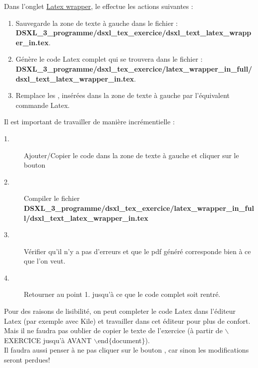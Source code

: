 \begin{dsxl}
 Dans l'onglet \underline{Latex wrapper}, le  effectue les actions suivantes :
 \begin{enumerate}
  \item Sauvegarde la zone de texte à gauche dans le fichier :\\
   {\bf DSXL\_3\_programme/dsxl\_tex\_exercice/dsxl\_text\_latex\_wrapper\_in.tex}. 
   \item Génère le code Latex complet qui se trouvera dans le fichier : \\
 {\bf DSXL\_3\_programme/dsxl\_tex\_exercice/latex\_wrapper\_in\_full/dsxl\_text\_latex\_wrapper\_in.tex}. 
 \item Remplace les ,  insérées dans la zone de texte à gauche par l'équivalent commande Latex.  
  
 \end{enumerate}

 
 
 Il est important de travailler de manière incrémentielle : 
 \begin{description}
  \item [1.] Ajouter/Copier le code dans la zone de texte à gauche et cliquer sur le bouton 
  \item[2.] Compiler le fichier \\
        {\bf\small DSXL\_3\_programme/dsxl\_tex\_exercice/latex\_wrapper\_in\_full/dsxl\_text\_latex\_wrapper\_in.tex}
  \item[3.] Vérifier qu'il n'y a pas d'erreurs et que le pdf généré corresponde bien à ce que l'on veut. 
  \item[4.] Retourner au point 1. jusqu'à ce que le code complet soit rentré. 
 \end{description}
\end{dsxl}

\begin{remarque}
 Pour des raisons de lisibilité, on peut completer le code Latex dans l'éditeur Latex (par exemple avec Kile) et travailler dans cet éditeur pour plus de confort. 
 Mais il ne faudra pas oublier de copier le texte de l'exercice (à partir de $\backslash$EXERCICE jusqu'à AVANT  $\backslash$end$\{$document$\}$). \\
 Il faudra aussi penser à ne pas cliquer sur le bouton , car sinon les modifications seront perdues! 
\end{remarque}


